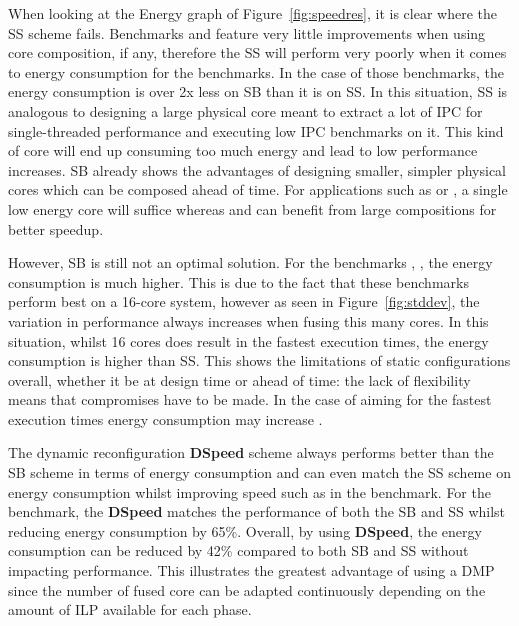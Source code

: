 When looking at the Energy graph of Figure~\ref{fig:speedres}, it is clear where the SS scheme fails.
Benchmarks  and  feature very little improvements when using core composition, if any, therefore the SS will perform very poorly when it comes to energy consumption for the benchmarks.
In the case of those benchmarks, the energy consumption is over 2x less on SB than it is on SS.
In this situation, SS is analogous to designing a large physical core meant to extract a lot of IPC for single-threaded performance and executing low IPC benchmarks on it.
This kind of core will end up consuming too much energy and lead to low performance increases.
SB already shows the advantages of designing smaller, simpler physical cores which can be composed ahead of time.
For applications such as  or , a single low energy core will suffice whereas  and  can benefit from large compositions for better speedup.

However, SB is still not an optimal solution. 
For the benchmarks , ,  the energy consumption is much higher.
This is due to the fact that these benchmarks perform best on a 16-core system, however as seen in Figure~\ref{fig:stddev}, the variation in performance always increases when fusing this many cores.
In this situation, whilst 16 cores does result in the fastest execution times, the energy consumption is higher than SS.
This shows the limitations of static configurations overall, whether it be at design time or ahead of time: the lack of flexibility means that compromises have to be made.
In the case of aiming for the fastest execution times energy consumption may increase .

The dynamic reconfiguration \textbf{DSpeed} scheme always performs better than the SB scheme in terms of energy consumption and can even match the SS scheme on energy consumption whilst improving speed such as in the  benchmark.
For the  benchmark, the \textbf{DSpeed} matches the performance of both the SB and SS whilst reducing energy consumption by 65\%.
Overall, by using \textbf{DSpeed}, the energy consumption can be reduced by 42\% compared to both SB and SS without impacting performance.
This illustrates the greatest advantage of using a DMP since the number of fused core can be adapted continuously depending on the amount of ILP available for each phase.



